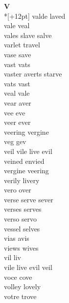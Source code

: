 \vspace{14pt}
\noindent\textbf{\Large V}\\*[+12pt]
valde laved\\
vale veal\\
vales slave salve\\
varlet travel\\
vase save\\
vast vats\\
vaster averts starve\\
vats vast\\
veal vale\\
vear aver\\
vee eve\\
veer ever\\
veering vergine\\
veg gev\\
veil vile live evil\\
veined envied\\
vergine veering\\
verily livery\\
vero over\\
verse serve sever\\
verses serves\\
verso servo\\
vessel selves\\
vias avis\\
views wives\\
vil liv\\
vile live evil veil\\
voce cove\\
volley lovely\\
votre trove\\

